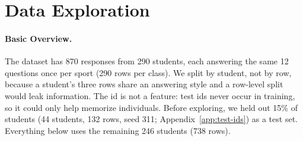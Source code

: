 \documentclass[11pt,letterpaper]{article}
\begin{document}
\section{Data Exploration}\label{sec:data-exploration}
%
%
%
%
%
%

\paragraph{Basic Overview.}
The dataset has 870 responses from 290 students, each answering the same 12
questions once per sport (290 rows per class). We split by student, not by row,
because a student's three rows share an answering style and a row-level split
would leak information. The id is not a feature: test ids never occur in
training, so it could only help memorize individuals. Before exploring, we held
out 15\% of students (44 students, 132 rows, seed 311;
Appendix~\ref{app:test-ids}) as a test set. Everything below uses the remaining
246 students (738 rows).
\end{document}
